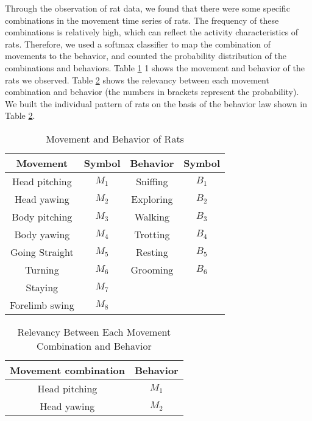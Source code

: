 Through the observation of rat data, we found that there were some specific combinations in the movement time series of rats. The frequency of these combinations is relatively high, which can reflect the activity characteristics of rats. Therefore, we used a softmax classifier to map the combination of movements to the behavior, and counted the probability distribution of the combinations and behaviors. Table \ref{table:movement and behavior of rats} 1 shows the movement and behavior of the rats we observed. Table \ref{table:relevancy between each movement combination and behavior} shows the relevancy between each movement combination and behavior (the numbers in brackets represent the probability). We built the individual pattern of rats on the basis of the behavior law shown in Table \ref{table:relevancy between each movement combination and behavior}.
\begin{table}[b]
    \caption{Movement and Behavior of Rats}
    \centering
    \begin{tabular}{cccc}
            \hline
            Movement & Symbol & Behavior & Symbol \\
            \hline
            Head pitching & $M_1$ & Sniffing & $B_1$ \\
            Head yawing & $M_2$ & Exploring & $B_2$ \\
            Body pitching & $M_3$ & Walking & $B_3$ \\
            Body yawing & $M_4$ & Trotting & $B_4$ \\
            Going Straight & $M_5$ & Resting & $B_5$ \\
            Turning & $M_6$ & Grooming & $B_6$ \\
            Staying & $M_7$ & & \\
            Forelimb swing & $M_8$ & & \\
            \hline
            \end{tabular}
    \label{table:movement and behavior of rats}
\end{table}

\begin{table}[b]
    \caption{Relevancy Between Each Movement Combination and Behavior}
    \centering
    \begin{tabular}{cc}
            \hline
            Movement combination & Behavior \\
            \hline
            Head pitching & $M_1$ \\
            Head yawing & $M_2$ \\
            \hline
            \end{tabular}
    \label{table:relevancy between each movement combination and behavior}
\end{table}

